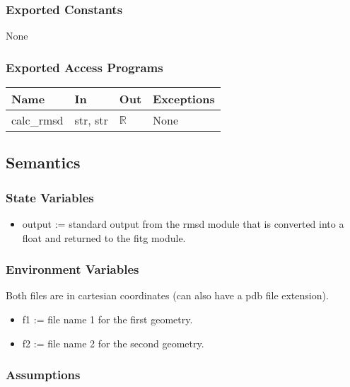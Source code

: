 \documentclass[12pt, titlepage]{article}
\begin{document}
\subsubsection{Exported Constants}

None

\subsubsection{Exported Access Programs}

\begin{center}
	\begin{tabular}{p{2cm} p{4cm} p{4cm} p{2cm}}
		\hline
		\textbf{Name} & \textbf{In} & \textbf{Out} & \textbf{Exceptions} \\
		\hline
		calc\_rmsd & str, str & $\mathbb{R}$ & None \\
		\hline
	\end{tabular}
\end{center}

\subsection{Semantics}

\subsubsection{State Variables}

\begin{itemize}
	\item output := standard output from the rmsd module that is converted into 
	a float and returned to the fitg module.
\end{itemize}

\subsubsection{Environment Variables}

Both files are in cartesian coordinates (can also have a pdb file extension).

\begin{itemize}
	\item f1 := file name 1 for the first geometry.
	\item f2 := file name 2 for the second geometry.
\end{itemize}

\subsubsection{Assumptions}
\end{document}
